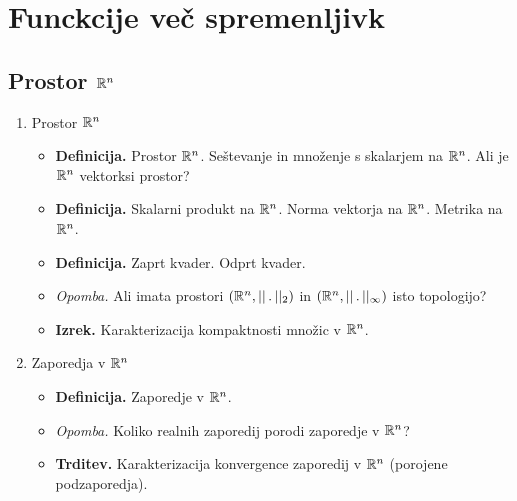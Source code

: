 \section{Funckcije več spremenljivk}
\subsection{Prostor $\mathbb{R}^n$}
\begin{enumerate}
    \item Prostor $\mathbb{R}^n$
    \begin{itemize}
        \item \colorbox{purple!30}{\textbf{Definicija.}} Prostor $\mathbb{R}^n$. Seštevanje in množenje s skalarjem na $\mathbb{R}^n$. Ali je $\mathbb{R}^n$ vektorksi prostor?
        \item \colorbox{purple!30}{\textbf{Definicija.}} Skalarni produkt na $\mathbb{R}^n$. Norma vektorja na $\mathbb{R}^n$. Metrika na $\mathbb{R}^n$.
        \item \colorbox{purple!30}{\textbf{Definicija.}} Zaprt kvader. Odprt kvader.
        \item \colorbox{yellow!30}{\emph{Opomba.}} Ali imata prostori $(\mathbb{R}^n, ||\,. \,||_2)$ in $(\mathbb{R}^n, ||\,. \,||_\infty)$ isto topologijo?
        \item \colorbox{blue!30}{\textbf{Izrek.}} Karakterizacija kompaktnosti množic v $\mathbb{R}^n$.
    \end{itemize}

    \item Zaporedja v $\mathbb{R}^n$
    \begin{itemize}
        \item \colorbox{purple!30}{\textbf{Definicija.}} Zaporedje v $\mathbb{R}^n$.
        \item \colorbox{yellow!30}{\emph{Opomba.}} Koliko realnih zaporedij porodi zaporedje v $\mathbb{R}^n$?
        \item \colorbox{blue!30}{\textbf{Trditev.}} Karakterizacija konvergence zaporedij v $\mathbb{R}^n$ (porojene podzaporedja).
    \end{itemize}
\end{enumerate}

